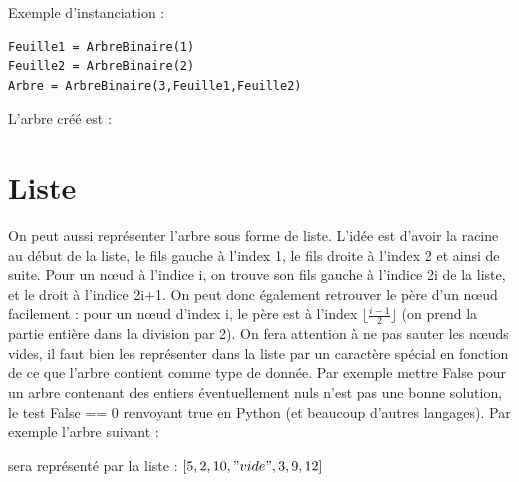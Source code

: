 \documentclass{report}
\begin{document}
Exemple d'instanciation :

\begin{lstlisting}
Feuille1 = ArbreBinaire(1)
Feuille2 = ArbreBinaire(2)
Arbre = ArbreBinaire(3,Feuille1,Feuille2)
\end{lstlisting}

L'arbre créé est :
\begin{center}
\end{center}

\section{Liste}

On peut aussi représenter l'arbre sous forme de liste. L'idée est d'avoir la racine au début de la liste, le fils gauche à l'index 1, le fils droite à l'index 2 et ainsi de suite. Pour un nœud à l'indice i, on trouve son fils gauche à l'indice 2i de la liste, et le droit à l'indice 2i+1. 
On peut donc également retrouver le père d'un nœud facilement : pour un nœud d'index i, le père est à l'index $\lfloor \frac{i-1}{2} \rfloor$ (on prend la partie entière dans la division par 2).
On fera attention à ne pas sauter les nœuds vides, il faut bien les représenter dans la liste par un caractère spécial en fonction de ce que l'arbre contient comme type de donnée. Par exemple mettre False pour un arbre contenant des entiers éventuellement nuls n'est pas une bonne solution, le test False == 0 renvoyant true en Python (et beaucoup d'autres langages).
Par exemple l'arbre suivant :

\begin{center}
\end{center}

sera représenté par la liste :
$[5,2,10,"vide",3,9,12]$
\end{document}
